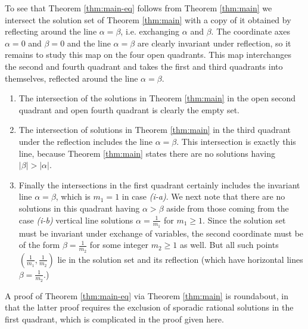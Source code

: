 \documentclass[12pt,letterpaper, reqno]{amsart}
\theoremstyle{definition}
\theoremstyle{remark}
\begin{document}
To see that Theorem \ref{thm:main-eq}  follows  from Theorem \ref{thm:main}
we intersect the solution set of  Theorem \ref{thm:main} with
a  copy of it obtained by reflecting around the line $\alpha=\beta$, i.e. exchanging $\alpha$ and $\beta$.
The coordinate axes $\alpha=0$ and $\beta=0$ and the line $\alpha=\beta$ are clearly 
invariant under reflection, so it remains to 
 study this map on the four open quadrants.
 This map interchanges
the second and fourth quadrant and takes the first and third quadrants into themselves,
reflected around the line $\alpha =\beta$.
\begin{enumerate}
\item
The intersection of the solutions in Theorem \ref{thm:main} in the open second quadrant
and open fourth quadrant is clearly the empty set. 
\item
The intersection of solutions in 
Theorem \ref{thm:main} in the third quadrant under the reflection includes  the line $\alpha=\beta$.
This intersection is exactly this line, 
because Theorem \ref{thm:main} states there are no solutions having $|\beta| > |\alpha|$.
\item 
Finally the intersections in the first quadrant certainly includes the invariant line $\alpha=\beta$,
which is $m_1=1$ in case {\it (i-a)}. 
We next note that there are no solutions in this quadrant having $\alpha > \beta$
aside from  those coming from the case {\it (i-b)} vertical line solutions $\alpha= \frac{1}{m_1}$
for $m_1 \ge 1$. Since the solution set must be invariant under exchange of variables,
the second coordinate must be of the form $\beta =\frac{1}{m_2}$ for some integer $m_2 \ge 1$
as well. But all such points $(\frac{1}{m_1}, \frac{1}{m_2})$ lie in the solution set and its
reflection (which have horizontal lines $\beta= \frac{1}{m_2}$.)
\end{enumerate}

A proof of Theorem \ref{thm:main-eq} via Theorem \ref{thm:main} is roundabout, in
that the latter proof requires the exclusion of sporadic rational solutions in the first
quadrant, which is  complicated in the proof given here.


\end{document}
